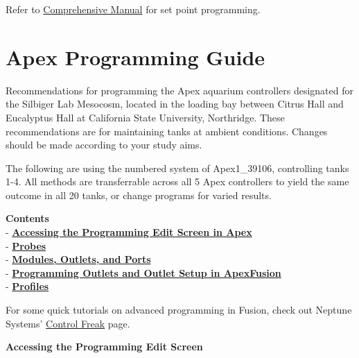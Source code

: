 \documentclass[
]{book}
\begin{document}
Refer to \href{https://github.com/SilbigerLab/Mesocosm_User_Manual/tree/7503b88686aef920c4a4ed473b1efe37b34dae10/Manuals/Apex_Comprehensive_Reference_Manual.pdf}{Comprehensive Manual} for set point programming.

\hypertarget{apex-programming-guide}{%
\chapter{Apex Programming Guide}\label{apex-programming-guide}}

Recommendations for programming the Apex aquarium controllers designated for the Silbiger Lab Mesocosm, located in the loading bay between Citrus Hall and Eucalyptus Hall at California State University, Northridge. These recommendations are for maintaining tanks at ambient conditions. Changes should be made according to your study aims.

The following are using the numbered system of Apex1\_39106, controlling tanks 1-4. All methods are transferrable across all 5 Apex controllers to yield the same outcome in all 20 tanks, or change programs for varied results.

\textbf{Contents}\\
- \protect\hyperlink{Programm_Screen}{\textbf{Accessing the Programming Edit Screen in Apex}}\\
- \protect\hyperlink{Probes}{\textbf{Probes}}\\
- \protect\hyperlink{Modules_Outlets_and_Ports}{\textbf{Modules, Outlets, and Ports}}\\
- \protect\hyperlink{Outlet_Setup}{\textbf{Programming Outlets and Outlet Setup in ApexFusion}}\\
- \protect\hyperlink{Profiles}{\textbf{Profiles}}

For some quick tutorials on advanced programming in Fusion, check out Neptune Systems' \href{https://www.neptunesystems.com/getstarted/apexng/apex-control-freak-advanced/}{Control Freak} page.

\textbf{Accessing the Programming Edit Screen}
\end{document}

